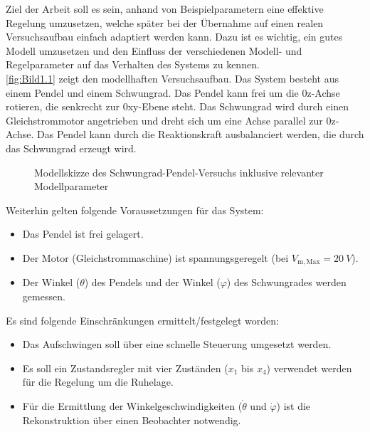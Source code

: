 Ziel der Arbeit soll es sein, anhand von Beispielparametern eine effektive Regelung umzusetzen, welche später bei der Übernahme auf einen realen Versuchsaufbau einfach adaptiert werden kann. Dazu ist es wichtig, ein gutes Modell umzusetzen und den Einfluss der verschiedenen Modell- und Regelparameter auf das Verhalten des Systems zu kennen. \\

\autoref{fig:Bild1.1} zeigt den modellhaften Versuchsaufbau. Das System besteht aus einem Pendel und einem Schwungrad. Das Pendel kann frei um die 0z-Achse rotieren, die senkrecht zur 0xy-Ebene steht. Das Schwungrad wird durch einen Gleichstrommotor angetrieben und dreht sich um eine Achse parallel zur 0z-Achse. Das Pendel kann durch die Reaktionskraft ausbalanciert werden, die durch das Schwungrad erzeugt wird.

\begin{figure}[H]
   \centering
   \caption[Modellskizze des Versuchs]{Modellskizze des Schwungrad-Pendel-Versuchs inklusive relevanter Modellparameter}
   \label{fig:Bild1.1}
\end{figure}

Weiterhin gelten folgende Voraussetzungen für das System:

\begin{itemize}
    \item Das Pendel ist frei gelagert.
    \item Der Motor (Gleichstrommaschine) ist spannungsgeregelt (bei $V_{\mathrm{m,Max}} = \SI{20}{V}$).
    \item Der Winkel ($\theta$) des Pendels und der Winkel ($\varphi$) des Schwungrades werden gemessen.
\end{itemize}

Es sind folgende Einschränkungen ermittelt/festgelegt worden:

\begin{itemize}
    \item Das Aufschwingen soll über eine schnelle Steuerung umgesetzt werden.
    \item Es soll ein Zustandsregler mit vier Zuständen ($x_{\mathrm{1}}$ bis $x_{\mathrm{4}}$) verwendet werden für die Regelung um die Ruhelage.
    \item Für die Ermittlung der Winkelgeschwindigkeiten ($\dot\theta$ und $\dot\varphi$) ist die Rekonstruktion über einen Beobachter notwendig.
\end{itemize}